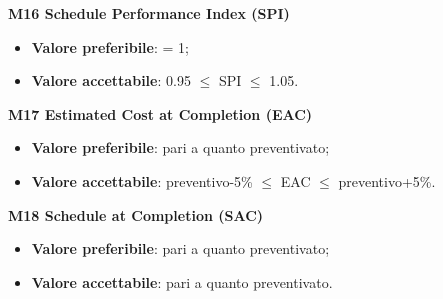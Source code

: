 				\textbf{M16 Schedule Performance Index (SPI)}
				\begin{itemize}
					\item \textbf{Valore preferibile}: = 1;
					\item \textbf{Valore accettabile}: 0.95 $\le$ SPI $\le$ 1.05.
				\end{itemize}
				\textbf{M17 Estimated Cost at Completion (EAC)}
				\begin{itemize}
					\item \textbf{Valore preferibile}: pari a quanto preventivato;
					\item \textbf{Valore accettabile}: preventivo-5\% $\le$ EAC $\le$ preventivo+5\%.
				\end{itemize}
				\textbf{M18 Schedule at Completion (SAC)}
				\begin{itemize}
					\item \textbf{Valore preferibile}: pari a quanto preventivato;
					\item \textbf{Valore accettabile}: pari a quanto preventivato.
				\end{itemize}
				
											
			
